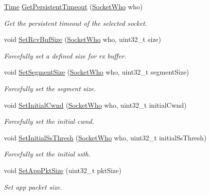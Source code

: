 \begin{DoxyCompactItemize}
\hyperlink{classns3_1_1Time}{Time} \hyperlink{classns3_1_1TcpGeneralTest_adac5d53797423699898a7dfe3bf7b86b}{Get\+Persistent\+Timeout} (\hyperlink{classns3_1_1TcpGeneralTest_a29338e6b7137cad650c2ff835713f6ee}{Socket\+Who} who)
\begin{DoxyCompactList}\small\item\em Get the persistent timeout of the selected socket. \end{DoxyCompactList}\item 
void \hyperlink{classns3_1_1TcpGeneralTest_a41a9e5ce0eab2c080fd501f6f246b9ee}{Set\+Rcv\+Buf\+Size} (\hyperlink{classns3_1_1TcpGeneralTest_a29338e6b7137cad650c2ff835713f6ee}{Socket\+Who} who, uint32\+\_\+t size)
\begin{DoxyCompactList}\small\item\em Forcefully set a defined size for rx buffer. \end{DoxyCompactList}\item 
void \hyperlink{classns3_1_1TcpGeneralTest_afcb6efab7790bc5b054c7323b1ae5664}{Set\+Segment\+Size} (\hyperlink{classns3_1_1TcpGeneralTest_a29338e6b7137cad650c2ff835713f6ee}{Socket\+Who} who, uint32\+\_\+t segment\+Size)
\begin{DoxyCompactList}\small\item\em Forcefully set the segment size. \end{DoxyCompactList}\item 
void \hyperlink{classns3_1_1TcpGeneralTest_a5a238ea27ee528f984f834e84bfe6e97}{Set\+Initial\+Cwnd} (\hyperlink{classns3_1_1TcpGeneralTest_a29338e6b7137cad650c2ff835713f6ee}{Socket\+Who} who, uint32\+\_\+t initial\+Cwnd)
\begin{DoxyCompactList}\small\item\em Forcefully set the initial cwnd. \end{DoxyCompactList}\item 
void \hyperlink{classns3_1_1TcpGeneralTest_ad5df8836a27fe3c7fa0719c51b2c13d5}{Set\+Initial\+Ss\+Thresh} (\hyperlink{classns3_1_1TcpGeneralTest_a29338e6b7137cad650c2ff835713f6ee}{Socket\+Who} who, uint32\+\_\+t initial\+Ss\+Thresh)
\begin{DoxyCompactList}\small\item\em Forcefully set the initial ssth. \end{DoxyCompactList}\item 
void \hyperlink{classns3_1_1TcpGeneralTest_a3135ee655332f67b8390691beaa08161}{Set\+App\+Pkt\+Size} (uint32\+\_\+t pkt\+Size)
\begin{DoxyCompactList}\small\item\em Set app packet size. \end{DoxyCompactList}\item 

\end{DoxyCompactItemize}
